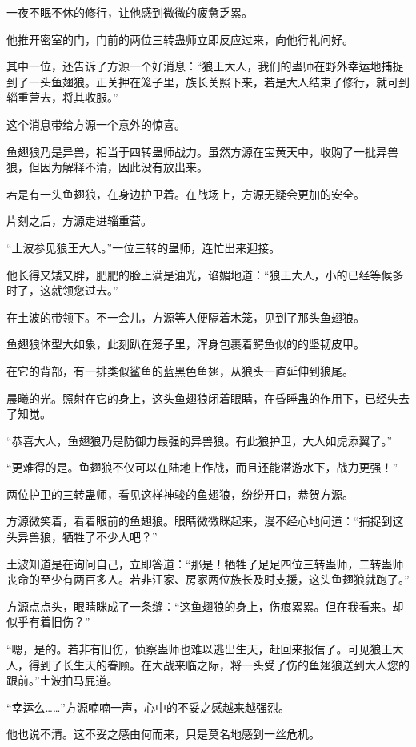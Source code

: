\begin{this_body}
一夜不眠不休的修行，让他感到微微的疲惫乏累。

他推开密室的门，门前的两位三转蛊师立即反应过来，向他行礼问好。

其中一位，还告诉了方源一个好消息：“狼王大人，我们的蛊师在野外幸运地捕捉到了一头鱼翅狼。正关押在笼子里，族长关照下来，若是大人结束了修行，就可到辎重营去，将其收服。”

这个消息带给方源一个意外的惊喜。

鱼翅狼乃是异兽，相当于四转蛊师战力。虽然方源在宝黄天中，收购了一批异兽狼，但因为解释不清，因此没有放出来。

若是有一头鱼翅狼，在身边护卫着。在战场上，方源无疑会更加的安全。

片刻之后，方源走进辎重营。

“土波参见狼王大人。”一位三转的蛊师，连忙出来迎接。

他长得又矮又胖，肥肥的脸上满是油光，谄媚地道：“狼王大人，小的已经等候多时了，这就领您过去。”

在土波的带领下。不一会儿，方源等人便隔着木笼，见到了那头鱼翅狼。

鱼翅狼体型大如象，此刻趴在笼子里，浑身包裹着鳄鱼似的的坚韧皮甲。

在它的背部，有一排类似鲨鱼的蓝黑色鱼翅，从狼头一直延伸到狼尾。

晨曦的光。照射在它的身上，这头鱼翅狼闭着眼睛，在昏睡蛊的作用下，已经失去了知觉。

“恭喜大人，鱼翅狼乃是防御力最强的异兽狼。有此狼护卫，大人如虎添翼了。”

“更难得的是。鱼翅狼不仅可以在陆地上作战，而且还能潜游水下，战力更强！”

两位护卫的三转蛊师，看见这样神骏的鱼翅狼，纷纷开口，恭贺方源。

方源微笑着，看着眼前的鱼翅狼。眼睛微微眯起来，漫不经心地问道：“捕捉到这头异兽狼，牺牲了不少人吧？”

土波知道是在询问自己，立即答道：“那是！牺牲了足足四位三转蛊师，二转蛊师丧命的至少有两百多人。若非汪家、房家两位族长及时支援，这头鱼翅狼就跑了。”

方源点点头，眼睛眯成了一条缝：“这鱼翅狼的身上，伤痕累累。但在我看来。却似乎有着旧伤？”

“嗯，是的。若非有旧伤，侦察蛊师也难以逃出生天，赶回来报信了。可见狼王大人，得到了长生天的眷顾。在大战来临之际，将一头受了伤的鱼翅狼送到大人您的跟前。”土波拍马屁道。

“幸运么……”方源喃喃一声，心中的不妥之感越来越强烈。

他也说不清。这不妥之感由何而来，只是莫名地感到一丝危机。


\end{this_body}
